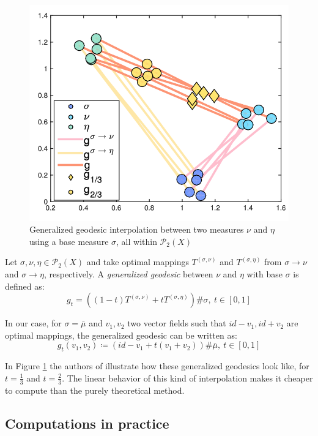 \documentclass{article}
\begin{document}
{

\begin{figure}
    \includegraphics[trim={0 1cm 0 1.5cm},width=\linewidth]{images/generalized_geodesics.png}
    \caption{Generalized geodesic interpolation between two measures $\nu$
    and $\eta$ using a base measure $\sigma$, all within $\mathscr{P}_2(X)$}
    \label{fig:generalized_geodesics}
\end{figure}

Let $\sigma,\nu,\eta\in\mathscr{P}_2(X)$ and take optimal mappings $T^{(\sigma, \nu)}$
and $T^{(\sigma,\eta)}$ from $\sigma\rightarrow\nu$ and $\sigma\rightarrow\eta$, respectively.
A \textit{generalized geodesic} between $\nu$ and $\eta$ with base $\sigma$ is 
defined as:
\[g_t = \left((1-t)T^{(\sigma, \nu)} + tT^{(\sigma, \eta)}\right)\#\sigma,\ t\in[0,1] \]

In our case, for $\sigma = \bar\mu$ and $v_1, v_2$ two vector fields such that
$id-v_1, id+v_2$ are optimal mappings, the generalized geodesic can be written as:
\[g_t(v_1, v_2)\coloneqq \left(id - v_1 + t(v_1+v_2)\right)\#\bar\mu,\ t\in[0,1]  \] 

In Figure \ref{fig:generalized_geodesics} the authors of \cite{seguycuturi2015}
illustrate how these generalized geodesics look like, for $t=\frac{1}{3}$ and 
$t = \frac{2}{3}$. The linear behavior of this kind of interpolation makes it 
cheaper to compute than the purely theoretical method.

}

\subsection{Computations in practice}
\end{document}
